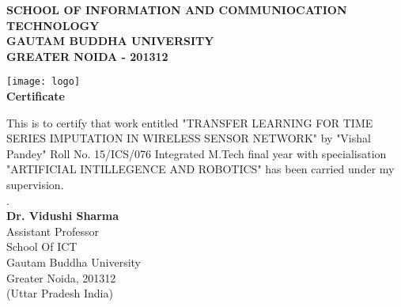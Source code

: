 \thispagestyle{plain}
\begin{center}

	\normalsize
	\textbf{SCHOOL OF INFORMATION AND COMMUNIOCATION TECHNOLOGY}\\
	\textbf{GAUTAM BUDDHA UNIVERSITY}\\
	\textbf{GREATER NOIDA - 201312}

	\vspace{0.5cm}

	\texttt{[image: logo]}\\
	\Large
	\textbf{Certificate}

\end{center}

\normalsize
This is to certify that work entitled "TRANSFER LEARNING FOR TIME SERIES IMPUTATION IN WIRELESS SENSOR NETWORK" by "Vishal Pandey" Roll No. 15/ICS/076 Integrated M.Tech final year with specialisation "ARTIFICIAL INTILLEGENCE AND ROBOTICS" has been carried under my supervision.\\

.\\
\textbf{Dr. Vidushi Sharma}\\
Assistant Professor\\
School Of ICT\\
Gautam Buddha University\\
Greater Noida, 201312\\
(Uttar Pradesh India)\\
